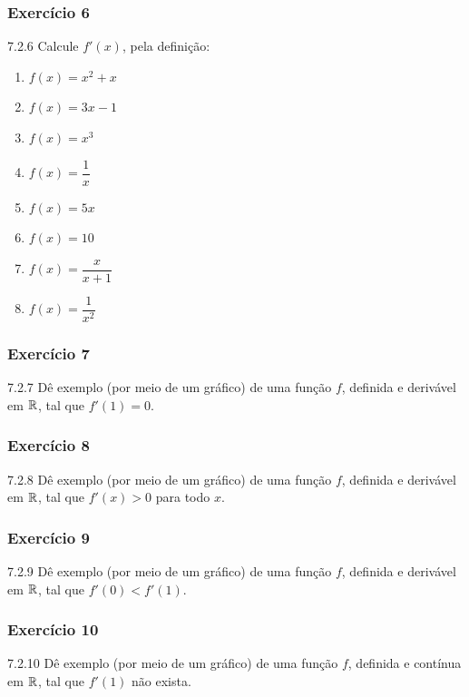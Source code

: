 \subsubsection*{Exercício 6}
\begin{exercicio}[6]{7.2.6}
Calcule $f'(x)$, pela definição:
\begin{enumerate}[label=\alph*)]
    \item $f(x) = x^2 + x$
    \item $f(x) = 3x - 1$
    \item $f(x) = x^3$
    \item $f(x) = \dfrac{1}{x}$
    \item $f(x) = 5x$
    \item $f(x) = 10$
    \item $f(x) = \dfrac{x}{x + 1}$
    \item $f(x) = \dfrac{1}{x^2}$
\end{enumerate}
\end{exercicio}

\subsubsection*{Exercício 7}
\begin{exercicio}[7]{7.2.7}
Dê exemplo (por meio de um gráfico) de uma função $f$, definida e derivável em $\mathbb{R}$, tal que $f'(1) = 0$.
\end{exercicio}

\subsubsection*{Exercício 8}
\begin{exercicio}[8]{7.2.8}
Dê exemplo (por meio de um gráfico) de uma função $f$, definida e derivável em $\mathbb{R}$, tal que $f'(x) > 0$ para todo $x$.
\end{exercicio}

\subsubsection*{Exercício 9}
\begin{exercicio}[9]{7.2.9}
Dê exemplo (por meio de um gráfico) de uma função $f$, definida e derivável em $\mathbb{R}$, tal que $f'(0) < f'(1)$.
\end{exercicio}

\subsubsection*{Exercício 10}
\begin{exercicio}[10]{7.2.10}
Dê exemplo (por meio de um gráfico) de uma função $f$, definida e contínua em $\mathbb{R}$, tal que $f'(1)$ não exista.
\end{exercicio}

